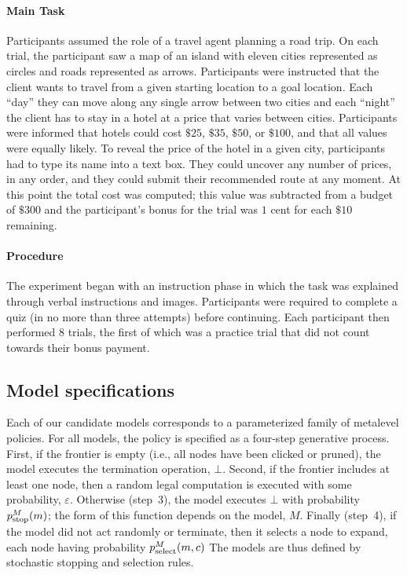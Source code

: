 \paragraph{Main Task}
Participants assumed the role of a travel agent planning a road trip. On each trial, the participant saw a map of an island with eleven cities represented as circles and roads represented as arrows. Participants were instructed that the client wants to travel from a given starting location to a goal location. Each ``day'' they can move along any single arrow between two cities and each ``night'' the client has to stay in a hotel at a price that varies between cities. Participants were informed that hotels could cost $\$25$, $\$35$, $\$50$, or $\$100$, and that all values were equally likely. To reveal the price of the hotel in a given city, participants had to type its name into a text box. They could uncover any number of prices, in any order, and they could submit their recommended route at any moment. At this point the total cost was computed; this value was subtracted from a budget of $\$300$ and the participant's bonus for the trial was $1$ cent for each $\$10$ remaining.

\paragraph{Procedure}
The experiment began with an instruction phase in which the task was explained through verbal instructions and images. Participants were required to complete a quiz (in no more than three attempts) before continuing.
Each participant then performed $8$ trials, the first of which was a practice trial that did not count towards their bonus payment.


\subsection{Model specifications}\label{sec:planning-modelspec}
Each of our candidate models corresponds to a parameterized family of metalevel policies. For all models, the policy is specified as a four-step generative process. First, if the frontier is empty (i.e., all nodes have been clicked or pruned), the model executes the termination operation, $\bot$. Second, if the frontier includes at least one node, then a random legal computation is executed with some probability, $\varepsilon$. Otherwise (step~3), the model executes $\bot$ with probability $p_{\mathrm{stop}}^M(m)$; the form of this function depends on the model, $M$. Finally (step~4), if the model did not act randomly or terminate, then it selects a node to expand, each node having probability $p_{\mathrm{select}}^M(m, c)$ The models are thus defined by stochastic stopping and selection rules.

